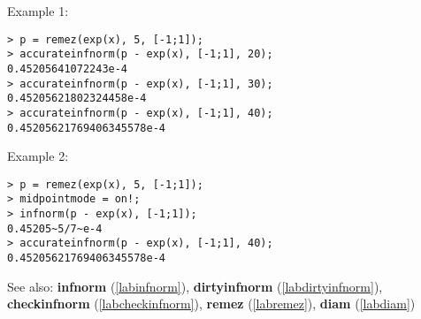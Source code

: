 \noindent Example 1: 
\begin{center}\begin{minipage}{15cm}\begin{Verbatim}[frame=single]
> p = remez(exp(x), 5, [-1;1]);
> accurateinfnorm(p - exp(x), [-1;1], 20);
0.45205641072243e-4
> accurateinfnorm(p - exp(x), [-1;1], 30);
0.45205621802324458e-4
> accurateinfnorm(p - exp(x), [-1;1], 40);
0.45205621769406345578e-4
\end{Verbatim}
\end{minipage}\end{center}
\noindent Example 2: 
\begin{center}\begin{minipage}{15cm}\begin{Verbatim}[frame=single]
> p = remez(exp(x), 5, [-1;1]);
> midpointmode = on!;
> infnorm(p - exp(x), [-1;1]);
0.45205~5/7~e-4
> accurateinfnorm(p - exp(x), [-1;1], 40);
0.45205621769406345578e-4
\end{Verbatim}
\end{minipage}\end{center}
See also: \textbf{infnorm} (\ref{labinfnorm}), \textbf{dirtyinfnorm} (\ref{labdirtyinfnorm}), \textbf{checkinfnorm} (\ref{labcheckinfnorm}), \textbf{remez} (\ref{labremez}), \textbf{diam} (\ref{labdiam})
